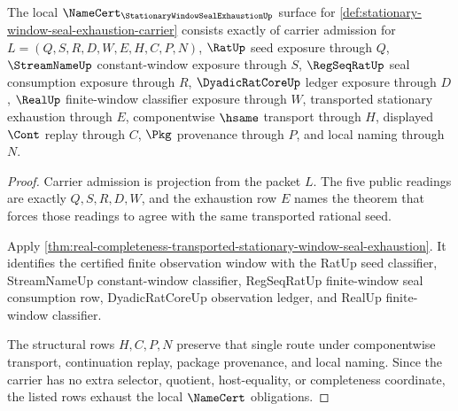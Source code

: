 \begin{theorem}
\label{thm:stationary-window-seal-exhaustion-namecert-obligations}
The local $\NameCert_{\StationaryWindowSealExhaustionUp}$ surface for \autoref{def:stationary-window-seal-exhaustion-carrier} consists exactly of carrier admission for $L=(Q,S,R,D,W,E,H,C,P,N)$, $\RatUp$ seed exposure through $Q$, $\StreamNameUp$ constant-window exposure through $S$, $\RegSeqRatUp$ seal consumption exposure through $R$, $\DyadicRatCoreUp$ ledger exposure through $D$, $\RealUp$ finite-window classifier exposure through $W$, transported stationary exhaustion through $E$, componentwise $\hsame$ transport through $H$, displayed $\Cont$ replay through $C$, $\Pkg$ provenance through $P$, and local naming through $N$.
\end{theorem}
\begin{proof}
Carrier admission is projection from the packet $L$. The five public readings are exactly $Q,S,R,D,W$, and the exhaustion row $E$ names the theorem that forces those readings to agree with the same transported rational seed.

Apply \autoref{thm:real-completeness-transported-stationary-window-seal-exhaustion}. It identifies the certified finite observation window with the RatUp seed classifier, StreamNameUp constant-window classifier, RegSeqRatUp finite-window seal consumption row, DyadicRatCoreUp observation ledger, and RealUp finite-window classifier.

The structural rows $H,C,P,N$ preserve that single route under componentwise transport, continuation replay, package provenance, and local naming. Since the carrier has no extra selector, quotient, host-equality, or completeness coordinate, the listed rows exhaust the local $\NameCert$ obligations.
\end{proof}

